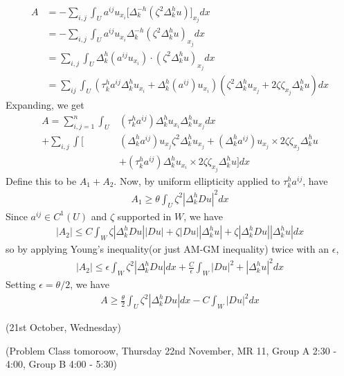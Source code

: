 \documentclass[12pt,a4paper]{report}
\newenvironment{proof}
{\begin{changemargin}{1cm}{0.5cm} 
	}%
	{\end{changemargin}
}
\begin{document}
\begin{proof}
\begin{itemize}
\begin{align*}
A &= -\sum_{i,j} \int_U a^{ij} u_{x_i} \Big[ \Delta_k^{-h} (\zeta^2 \Delta_k^h u) \Big]_{x_j} dx \\
&= -\sum_{i,j} \int_U a^{ij} u_{x_i} \Delta_k^{-h} (\zeta^2 \Delta_k^h u)_{x_j} dx \\
&= \sum_{i,j} \int_U \Delta_k^{h}(a^{ij} u_{x_i}) \cdot (\zeta^2 \Delta_k^h u)_{x_j} dx \\
&= \sum_{ij} \int_U (\tau_k^h a^{ij} \Delta_k^h u_{x_i} + \Delta_k^h (a^{ij}) u_{x_i})(\zeta^2 \Delta_k^h u_{x_j} + 2\zeta \zeta_{x_j} \Delta_k^h u) dx
\end{align*}
Expanding, we get
\begin{align*}
A = \sum_{i,j=1}^n \int_U & (\tau_k^h a^{ij}) \Delta_k^h u_{x_i} \Delta_k^h u_{x_j} dx \\
+ \sum_{i,j} \int \Big[ & (\Delta_k^h a^{ij})u_{x_j}\zeta^2 \Delta_k^h u_{x_j} + (\Delta_k^h a^{ij})u_{x_j} \times 2\zeta \zeta_{x_j} \Delta_k^h u \\
& + (\tau_k^h a^{ij})\Delta_k^h u_{x_i} \times 2\zeta \zeta_{x_j} \Delta_k^h u \Big] dx
\end{align*}
Define this to be $A_1 + A_2$. Now, by uniform ellipticity applied to $\tau_k^h a^{ij}$, have
\begin{align*}
A_1 \geq \theta \int_U \zeta^2 |\Delta_k^h Du|^2 dx
\end{align*}
Since $a^{ij}\in C^1(U)$ and $\zeta$ supported in $W$, we have
\begin{align*}
|A_2| \leq C \int_W \zeta |\Delta_k^h Du| |Du| + \zeta |Du||\Delta_k^h u|  + \zeta |\Delta_k^h Du| |\Delta_k^h u| dx
\end{align*}
so by applying Young's inequality(or just AM-GM inequality) twice with an $\epsilon$,
\begin{align*}
|A_2| \leq \epsilon \int_W \zeta^2 |\Delta_k^h Du| dx + \frac{C}{\epsilon} \int_W |Du|^2 + |\Delta_k^h u|^2 dx
\end{align*}
Setting $\epsilon=\theta/2$, we have
\begin{align*}
A \geq \frac{\theta}{2} \int_U \zeta^2 |\Delta^h_k Du| dx - C \int_W |Du|^2 dx
\end{align*}
\end{itemize}
\end{proof}
\s

\newday

(21st October, Wednesday)
\s

(Problem Class tomoroow, Thursday 22nd November, MR 11, Group A 2:30 - 4:00, Group B 4:00 - 5:30)
\s
\end{document}
